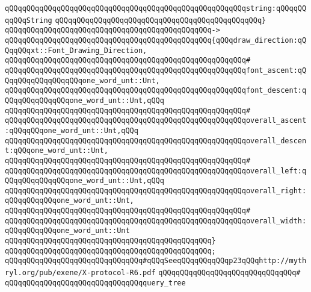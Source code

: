 \verb|qQQqqQQqqQQqqQQqqQQqqQQqqQQqqQQqqQQqqQQqqQQqqQQqqQQqqQQqstring:qQQqqQQqqQQqString|\newline
\verb|qQQqqQQqqQQqqQQqqQQqqQQqqQQqqQQqqQQqqQQqqQQqqQQq}|\newline
\verb|qQQqqQQqqQQqqQQqqQQqqQQqqQQqqQQqqQQqqQQqqQQqqQQq->|\newline
\verb|qQQqqQQqqQQqqQQqqQQqqQQqqQQqqQQqqQQqqQQqqQQqqQQq{qQQqdraw_direction:qQQqqQQqxt::Font_Drawing_Direction,|\newline
\verb|qQQqqQQqqQQqqQQqqQQqqQQqqQQqqQQqqQQqqQQqqQQqqQQqqQQqqQQq#|\newline
\verb|qQQqqQQqqQQqqQQqqQQqqQQqqQQqqQQqqQQqqQQqqQQqqQQqqQQqqQQqfont_ascent:qQQqqQQqqQQqqQQqqQQqone_word_unt::Unt,|\newline
\verb|qQQqqQQqqQQqqQQqqQQqqQQqqQQqqQQqqQQqqQQqqQQqqQQqqQQqqQQqfont_descent:qQQqqQQqqQQqqQQqone_word_unt::Unt,qQQq|\newline
\verb|qQQqqQQqqQQqqQQqqQQqqQQqqQQqqQQqqQQqqQQqqQQqqQQqqQQqqQQq#|\newline
\verb|qQQqqQQqqQQqqQQqqQQqqQQqqQQqqQQqqQQqqQQqqQQqqQQqqQQqqQQqoverall_ascent:qQQqqQQqone_word_unt::Unt,qQQq|\newline
\verb|qQQqqQQqqQQqqQQqqQQqqQQqqQQqqQQqqQQqqQQqqQQqqQQqqQQqqQQqoverall_descent:qQQqone_word_unt::Unt,|\newline
\verb|qQQqqQQqqQQqqQQqqQQqqQQqqQQqqQQqqQQqqQQqqQQqqQQqqQQqqQQq#|\newline
\verb|qQQqqQQqqQQqqQQqqQQqqQQqqQQqqQQqqQQqqQQqqQQqqQQqqQQqqQQqoverall_left:qQQqqQQqqQQqqQQqone_word_unt::Unt,qQQq|\newline
\verb|qQQqqQQqqQQqqQQqqQQqqQQqqQQqqQQqqQQqqQQqqQQqqQQqqQQqqQQqoverall_right:qQQqqQQqqQQqone_word_unt::Unt,|\newline
\verb|qQQqqQQqqQQqqQQqqQQqqQQqqQQqqQQqqQQqqQQqqQQqqQQqqQQqqQQq#|\newline
\verb|qQQqqQQqqQQqqQQqqQQqqQQqqQQqqQQqqQQqqQQqqQQqqQQqqQQqqQQqoverall_width:qQQqqQQqqQQqone_word_unt::Unt|\newline
\verb|qQQqqQQqqQQqqQQqqQQqqQQqqQQqqQQqqQQqqQQqqQQqqQQq}|\newline
\verb|qQQqqQQqqQQqqQQqqQQqqQQqqQQqqQQqqQQqqQQqqQQqqQQq;|\newline
\newline
\verb|qQQqqQQqqQQqqQQqqQQqqQQqqQQqqQQq#qQQqSeeqQQqqQQqqQQqp23qQQqhttp://mythryl.org/pub/exene/X-protocol-R6.pdf|\newline
\verb|qQQqqQQqqQQqqQQqqQQqqQQqqQQqqQQq#|\newline
\verb|qQQqqQQqqQQqqQQqqQQqqQQqqQQqqQQqquery_tree|\newline
